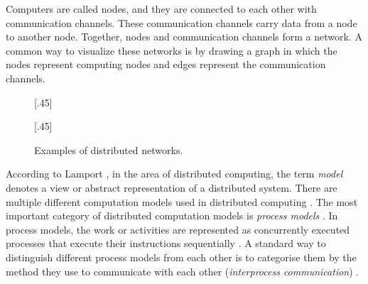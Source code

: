 Computers are called nodes, and they are connected to each other with communication channels.
These communication channels carry data from a node to another node.
Together, nodes and communication channels form a network.
A common way to visualize these networks is by drawing a graph in which the nodes represent computing nodes and edges represent the communication channels.
\cite{HirvonenSuomelaDistAlg2020}


\begin{figure}[H]
    [.45\linewidth] {
    \centering
  }
  \hfill
    [.45\linewidth] {
    \centering
  }
  \caption{Examples of distributed networks.}
  \label{fig:dist_comp1}
\end{figure}
According to Lamport \cite{DBLP:books/el/leeuwen90/LamportL90}, in the area of distributed computing, the term \emph{model} denotes a view or abstract representation of a distributed system.
There are multiple different computation models used in distributed computing \cite{DBLP:books/el/leeuwen90/LamportL90}.
The most important category of distributed computation models is \emph{process models} \cite{DBLP:books/el/leeuwen90/LamportL90}.
In process models, the work or activities are represented as concurrently executed processes that execute their instructions sequentially \cite{DBLP:books/el/leeuwen90/LamportL90}.
A standard way to distinguish different process models from each other is to categorise them by the method they use to communicate with each other (\emph{interprocess communication}) \cite{DBLP:books/el/leeuwen90/LamportL90}.


